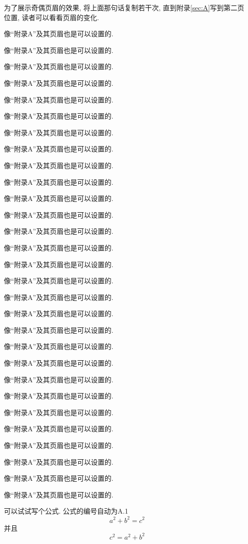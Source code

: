 \documentclass{scutbthesis}
\begin{document}
为了展示奇偶页眉的效果, 将上面那句话复制若干次, 直到附录\ref{sec:A}写到第二页位置, 读者可以看看页眉的变化.

像``附录A''及其页眉也是可以设置的.

像``附录A''及其页眉也是可以设置的.

像``附录A''及其页眉也是可以设置的.

像``附录A''及其页眉也是可以设置的.

像``附录A''及其页眉也是可以设置的.

像``附录A''及其页眉也是可以设置的.

像``附录A''及其页眉也是可以设置的.

像``附录A''及其页眉也是可以设置的.

像``附录A''及其页眉也是可以设置的.

像``附录A''及其页眉也是可以设置的.

像``附录A''及其页眉也是可以设置的.

像``附录A''及其页眉也是可以设置的.

像``附录A''及其页眉也是可以设置的.

像``附录A''及其页眉也是可以设置的.

像``附录A''及其页眉也是可以设置的.

像``附录A''及其页眉也是可以设置的.

像``附录A''及其页眉也是可以设置的.

像``附录A''及其页眉也是可以设置的.

像``附录A''及其页眉也是可以设置的.

像``附录A''及其页眉也是可以设置的.

像``附录A''及其页眉也是可以设置的.

像``附录A''及其页眉也是可以设置的.

像``附录A''及其页眉也是可以设置的.

像``附录A''及其页眉也是可以设置的.

像``附录A''及其页眉也是可以设置的.

像``附录A''及其页眉也是可以设置的.

像``附录A''及其页眉也是可以设置的.

像``附录A''及其页眉也是可以设置的.

像``附录A''及其页眉也是可以设置的.

可以试试写个公式. 公式的编号自动为A.1
\begin{equation}\label{equ:A:1}
a^2+b^2=c^2
\end{equation}
并且
\begin{equation}\label{equ:A:2}
c^2=a^2+b^2
\end{equation}
\end{document}
